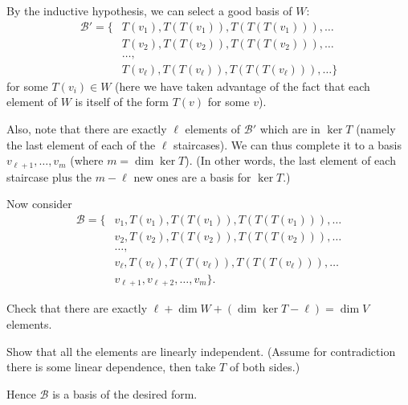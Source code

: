 By the inductive hypothesis, we can select a good basis of $W$:
\begin{align*}
	\mathcal B' =
	\Big\{ & T(v_1), T(T(v_1)), T(T(T(v_1))), \dots \\
	& T(v_2), T(T(v_2)), T(T(T(v_2))), \dots \\
	& \dots, \\
	& T(v_\ell), T(T(v_\ell)), T(T(T(v_\ell))), \dots \Big\}
\end{align*}
for some $T(v_i) \in W$ (here we have taken advantage of the fact that each element of $W$ is itself of the form $T(v)$ for some $v$).

Also, note that there are exactly $\ell$ elements of $\mathcal B'$ which are in $\ker T$
(namely the last element of each of the $\ell$ staircases).
We can thus complete it to a basis $v_{\ell+1}, \dots, v_m$ (where $m = \dim \ker T$).
(In other words, the last element of each staircase plus the $m-\ell$ new ones are a basis for $\ker T$.)

Now consider
\begin{align*}
	\mathcal B =
	\Big\{ & v_1, T(v_1), T(T(v_1)), T(T(T(v_1))), \dots \\
	& v_2, T(v_2), T(T(v_2)), T(T(T(v_2))), \dots \\
	& \dots, \\
	& v_\ell, T(v_\ell), T(T(v_\ell)), T(T(T(v_\ell))), \dots \\
	& v_{\ell+1}, v_{\ell+2}, \dots, v_m \Big\}.
\end{align*}
\begin{ques}
Check that there are exactly $\ell + \dim W + (\dim \ker T - \ell) = \dim V$ elements.
\end{ques}
\begin{exercise}
	Show that all the elements are linearly independent.
	(Assume for contradiction there is some linear dependence,
	then take $T$ of both sides.)
\end{exercise}
Hence $\mathcal B$ is a basis of the desired form.

